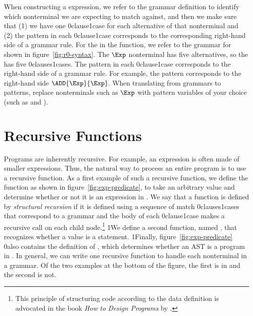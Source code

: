 \documentclass[7x10]{TimesAPriori_MIT}%
\def\racketEd{0}
\def\pythonEd{1}
\def\edition{1}
\newcommand{\racket}[1]{{\if\edition\racketEd{#1}\fi}}
\newcommand{\pythonColor}[0]{}
\newcommand{\python}[1]{{\if\edition\pythonEd\pythonColor #1\fi}}
\numberwithin{theorem}{chapter}
\numberwithin{definition}{chapter}
\numberwithin{equation}{chapter}
\begin{document}
When constructing a  expression, we refer to the grammar
definition to identify which nonterminal we are expecting to match
against, and then we make sure that (1) we have one
\racket{clause}\python{case} for each alternative of that nonterminal
and (2) the pattern in each \racket{clause}\python{case}
corresponds to the corresponding right-hand side of a grammar
rule. For the  in the  function, we refer to
the grammar for \LangInt{} shown in figure~\ref{fig:r0-syntax}. The $\Exp$
nonterminal has five alternatives, so the  has five
\racket{clauses}\python{cases}.  The pattern in each
\racket{clause}\python{case} corresponds to the right-hand side of a
grammar rule. For example, the pattern 
corresponds to the right-hand side $\ADD{\Exp}{\Exp}$. When
translating from grammars to patterns, replace nonterminals such as
$\Exp$ with pattern variables of your choice (such as  and
).


\section{Recursive Functions}
\label{sec:recursion}

Programs are inherently recursive. For example, an expression is often
made of smaller expressions. Thus, the natural way to process an
entire program is to use a recursive function.  As a first example of
such a recursive function, we define the function  as
shown in figure~\ref{fig:exp-predicate}, to take an arbitrary
value and determine whether or not it is an expression in \LangInt{}.
%
We say that a function is defined by \emph{structural recursion} if
it is defined using a sequence of match \racket{clauses}\python{cases}
that correspond to a grammar and the body of each
\racket{clause}\python{case} makes a recursive call on each child
node.\footnote{This principle of structuring code according to the
  data definition is advocated in the book \emph{How to Design
    Programs} by \citet{Felleisen:2001aa}.}  \python{We define a
  second function, named , that recognizes whether a value
  is a \LangInt{} statement.}  \python{Finally, }
figure~\ref{fig:exp-predicate} \racket{also} contains the definition of
, which determines whether an AST is a program in \LangInt{}.
In general, we can write one recursive function to handle each
nonterminal in a grammar. Of the
two examples at the bottom of the figure, the first is in
\LangInt{} and the second is not.
\end{document}
